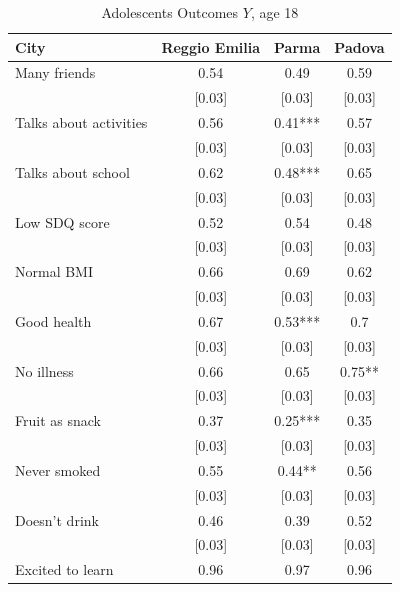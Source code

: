 \documentclass[12pt]{article}
\begin{document}
\begin{table}[ht]
\caption{Adolescents Outcomes $Y$, age 18}
\label{tab:adoOutcomes}
\begin{center}
    \begin{tabular}{lccc}
    \hline \hline
    City  & Reggio Emilia & Parma & Padova \\
    \hline

    Many friends & 0.54  & 0.49  & 0.59 \\
          & [0.03] & [0.03] & [0.03] \\
    Talks about activities & 0.56  & 0.41*** & 0.57 \\
          & [0.03] & [0.03] & [0.03] \\
    Talks about school & 0.62  & 0.48*** & 0.65 \\
          & [0.03] & [0.03] & [0.03] \\
    Low SDQ score & 0.52  & 0.54  & 0.48 \\
          & [0.03] & [0.03] & [0.03] \\
    Normal BMI & 0.66  & 0.69  & 0.62 \\
          & [0.03] & [0.03] & [0.03] \\
    Good health & 0.67  & 0.53*** & 0.7 \\
          & [0.03] & [0.03] & [0.03] \\
    No illness & 0.66  & 0.65  & 0.75** \\
          & [0.03] & [0.03] & [0.03] \\
    Fruit as snack & 0.37  & 0.25*** & 0.35 \\
          & [0.03] & [0.03] & [0.03] \\
    Never smoked & 0.55  & 0.44** & 0.56 \\
          & [0.03] & [0.03] & [0.03] \\
    Doesn't drink & 0.46  & 0.39  & 0.52 \\
          & [0.03] & [0.03] & [0.03] \\
    Excited to learn & 0.96  & 0.97  & 0.96 \\

\end{tabular}
\end{center}
\end{table}
\end{document}
